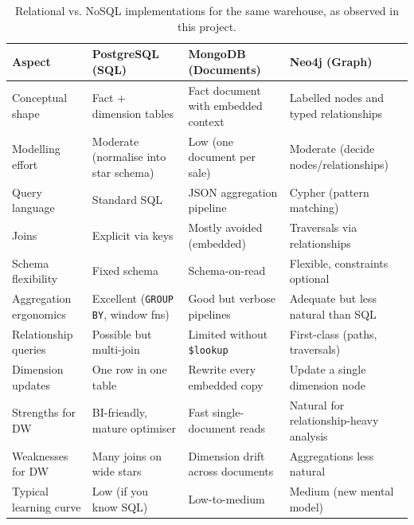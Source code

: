 \documentclass[11pt,a4paper]{article}
\begin{document}
\begin{table}[H]
\centering
\caption{Relational vs. NoSQL implementations for the same warehouse, as observed in this project.}
\label{tab:compare}
\begin{tabularx}{\textwidth}{l X X X}
\toprule
\textbf{Aspect} & \textbf{PostgreSQL (SQL)} & \textbf{MongoDB (Documents)} & \textbf{Neo4j (Graph)} \\
\midrule
Conceptual shape     & Fact + dimension tables                 & Fact document with embedded context & Labelled nodes and typed relationships \\
Modelling effort     & Moderate (normalise into star schema)   & Low (one document per sale)         & Moderate (decide nodes/relationships) \\
Query language       & Standard SQL                            & JSON aggregation pipeline           & Cypher (pattern matching)             \\
Joins                & Explicit via keys                       & Mostly avoided (embedded)           & Traversals via relationships          \\
Schema flexibility   & Fixed schema                            & Schema-on-read                      & Flexible, constraints optional        \\
Aggregation ergonomics & Excellent (\texttt{GROUP BY}, window fns) & Good but verbose pipelines       & Adequate but less natural than SQL    \\
Relationship queries & Possible but multi-join                 & Limited without \texttt{\$lookup}   & First-class (paths, traversals)       \\
Dimension updates    & One row in one table                    & Rewrite every embedded copy         & Update a single dimension node        \\
Strengths for DW     & BI-friendly, mature optimiser           & Fast single-document reads          & Natural for relationship-heavy analysis \\
Weaknesses for DW    & Many joins on wide stars                & Dimension drift across documents    & Aggregations less natural             \\
Typical learning curve & Low (if you know SQL)                 & Low-to-medium                       & Medium (new mental model)             \\
\bottomrule
\end{tabularx}
\end{table}
\end{document}

